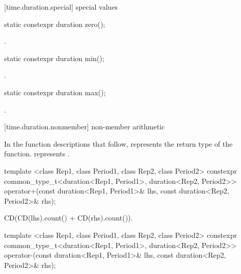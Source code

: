 [time.duration.special]{ special values}

%
%
\begin{itemdecl}
static constexpr duration zero();
\end{itemdecl}

\begin{itemdescr}
\pnum
\returns {}.
\end{itemdescr}

%
%
\begin{itemdecl}
static constexpr duration min();
\end{itemdecl}

\begin{itemdescr}
\pnum
\returns {}.
\end{itemdescr}

%
%
\begin{itemdecl}
static constexpr duration max();
\end{itemdecl}

\begin{itemdescr}
\pnum
\returns {}.
\end{itemdescr}

[time.duration.nonmember]{ non-member arithmetic}

\pnum
In the function descriptions that follow,  represents the return type
of the function.  represents .

%
\begin{itemdecl}
template <class Rep1, class Period1, class Rep2, class Period2>
  constexpr common_type_t<duration<Rep1, Period1>, duration<Rep2, Period2>>
  operator+(const duration<Rep1, Period1>& lhs, const duration<Rep2, Period2>& rhs);
\end{itemdecl}

\begin{itemdescr}
\pnum
\returns CD(CD(lhs).count() + CD(rhs).count()).
\end{itemdescr}

%
\begin{itemdecl}
template <class Rep1, class Period1, class Rep2, class Period2>
  constexpr common_type_t<duration<Rep1, Period1>, duration<Rep2, Period2>>
  operator-(const duration<Rep1, Period1>& lhs, const duration<Rep2, Period2>& rhs);
\end{itemdecl}

